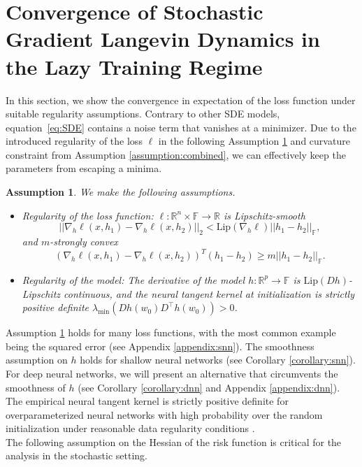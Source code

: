 \documentclass[10pt]{article} %
\def\eqref#1{equation~\ref{#1}}
\newcommand{\R}{\mathbb{R}}
\newcommand{\bF}{\mathbb{F}}
\newtheorem{assumption}{Assumption}
\begin{document}
\section{Convergence of Stochastic Gradient Langevin Dynamics in the Lazy Training Regime}
In this section, we show the convergence in expectation of the loss function under suitable regularity assumptions. Contrary to other SDE models, \eqref{eq:SDE} contains a noise term that vanishes at a minimizer. Due to the introduced regularity of the loss $\ell$ in the following Assumption \ref{assumption:l} and curvature constraint from Assumption \ref{assumption:combined}, we can effectively keep the parameters from escaping a minima. 
\begin{assumption}\label{assumption:l} We make the following assumptions.
    \begin{itemize}
        \item Regularity of the loss function: $\ell:\R^n\times\bF\rightarrow \R$ is Lipschitz-smooth
    $$||\nabla_h \ell(x,h_1)-\nabla_h \ell(x,h_2)||_2<\mathrm{Lip}(\nabla_h \ell) ||h_1-h_2||_\bF,$$
    and $m$-strongly convex
    $$(\nabla_h \ell(x,h_1)-\nabla_h \ell(x,h_2))^T(h_1-h_2)\geq m ||h_1-h_2||_\bF.$$
    \item Regularity of the model: The derivative of the model $h:\R^p\rightarrow \bF$ is $\mathrm{Lip}(Dh)$-Lipschitz continuous, and the neural tangent kernel at initialization is strictly positive definite 
    $\lambda_{\min}(Dh(w_0)D^\top h(w_0)) > 0$.
    \end{itemize}
\end{assumption}
Assumption \ref{assumption:l} holds for many loss functions, with the most common example being the squared error (see Appendix \ref{appendix:snn}). The smoothness assumption on $h$ holds for shallow neural networks (see Corollary \ref{corollary:snn}). For deep neural networks, we will present an alternative that circumvents the smoothness of $h$ (see Corollary \ref{corollary:dnn} and Appendix \ref{appendix:dnn}). The empirical neural tangent kernel is strictly positive definite for overparameterized neural networks with high probability over the random initialization under reasonable data regularity conditions \citep{du2018gradient, du2019gradientdescentfindsglobal, banerjee2023neural}.\\
The following assumption on the Hessian of the risk function is critical for the analysis in the stochastic setting.
\end{document}
